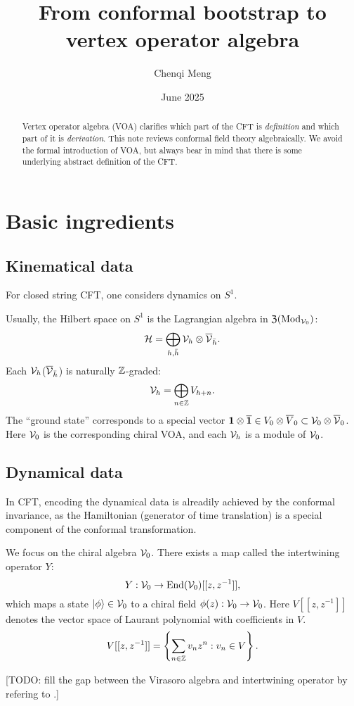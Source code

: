 \documentclass{article}
\title{From conformal bootstrap to vertex operator algebra}
\author{Chenqi Meng}
\date{June 2025}
\begin{document}
\maketitle


\begin{abstract}
    Vertex operator algebra (VOA) clarifies which part of the CFT is \emph{definition} and which part of it is \emph{derivation}.
    This note reviews conformal field theory algebraically. We avoid the formal introduction of VOA, but always bear in mind that there is some underlying abstract definition of the CFT. 
\end{abstract}
\tableofcontents
\section{Basic ingredients}
\subsection{Kinematical data}
For closed string CFT, one considers dynamics on $S^1$. 

Usually, the Hilbert space on $S^1$ is the Lagrangian algebra in $\frak{Z}(\mathrm{Mod}_{{\cal V}_0})$:
\[
{\cal H} = \bigoplus_{h,\bar{h}}{\cal V}_{h}\otimes\overline{{\cal V}}_{\bar{h}}.
\]
Each ${\cal V}_{h}$($\overline{{\cal V}}_{\bar{h}}$) is naturally $\mathbb{Z}$-graded:
\[
{\cal V}_h = \bigoplus_{n\in \mathbb{Z}} V_{h+n}.
\]
The ``ground state'' corresponds to a special vector $\mathbf{1} \otimes\overline{\mathbf{1}} \in V_{0}\otimes \overline{V}_0\subset {\cal V}_{0}\otimes \overline{{\cal V}}_0$.
Here ${\cal V}_0$ is the corresponding chiral VOA, and each ${\cal V}_h$ is a module of ${\cal V}_0$.

\subsection{Dynamical data}
In CFT, encoding the dynamical data is alreadily achieved by the conformal invariance, as the Hamiltonian (generator of time translation) is a special component of the conformal transformation.

We focus on the chiral algebra ${\cal V}_0$. There exists a map called the intertwining operator $Y$:
\[
Y:{\cal V}_0\rightarrow \mathrm{End}({\cal V}_0)[[z,z^{-1}]],
\]
which maps a state $|\phi\rangle\in {\cal V}_0$ to a chiral field $\phi(z):{\cal V}_0\rightarrow {\cal V}_0$. Here $V[[z,z^{-1}]]$ denotes the vector space of Laurant polynomial with coefficients in $V$.
\[
V[[z,z^{-1}]] = \left\{\sum_{n\in \mathbb{Z}}v_nz^{n}:v_n\in V\right\}.
\]

[TODO: fill the gap between the Virasoro algebra and intertwining operator by refering to \cite{vertex_operator_algebra:Wikipedia}.]
\end{document}
